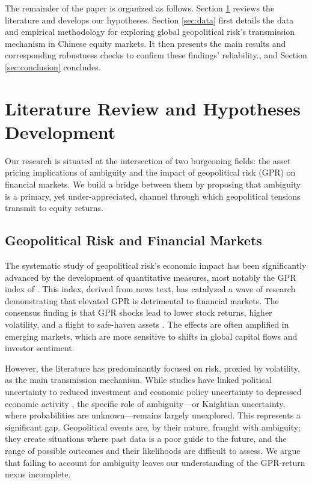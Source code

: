 \documentclass[preprint,12pt,authoryear]{elsarticle}
\begin{document}
The remainder of the paper is organized as follows. Section \ref{sec:literature} reviews the literature and develops our hypotheses. Section \ref{sec:data} first details the data and empirical methodology for exploring global geopolitical risk’s transmission mechanism in Chinese equity markets. It then presents the main results and corresponding robustness checks to confirm these findings’ reliability., and Section \ref{sec:conclusion} concludes.

\section{Literature Review and Hypotheses Development}
\label{sec:literature}

Our research is situated at the intersection of two burgeoning fields: the asset pricing implications of ambiguity and the impact of geopolitical risk (GPR) on financial markets. We build a bridge between them by proposing that ambiguity is a primary, yet under-appreciated, channel through which geopolitical tensions transmit to equity returns.

\subsection{Geopolitical Risk and Financial Markets}

The systematic study of geopolitical risk's economic impact has been significantly advanced by the development of quantitative measures, most notably the GPR index of \citet{Caldara2022}. This index, derived from news text, has catalyzed a wave of research demonstrating that elevated GPR is detrimental to financial markets. The consensus finding is that GPR shocks lead to lower stock returns, higher volatility, and a flight to safe-haven assets \citep{Caldara2022}. The effects are often amplified in emerging markets, which are more sensitive to shifts in global capital flows and investor sentiment.

However, the literature has predominantly focused on risk, proxied by volatility, as the main transmission mechanism. While studies have linked political uncertainty to reduced investment \citep{Pastor2013} and economic policy uncertainty to depressed economic activity \citep{Baker2016}, the specific role of ambiguity—or Knightian uncertainty, where probabilities are unknown—remains largely unexplored. This represents a significant gap. Geopolitical events are, by their nature, fraught with ambiguity; they create situations where past data is a poor guide to the future, and the range of possible outcomes and their likelihoods are difficult to assess. We argue that failing to account for ambiguity leaves our understanding of the GPR-return nexus incomplete.
\end{document}
